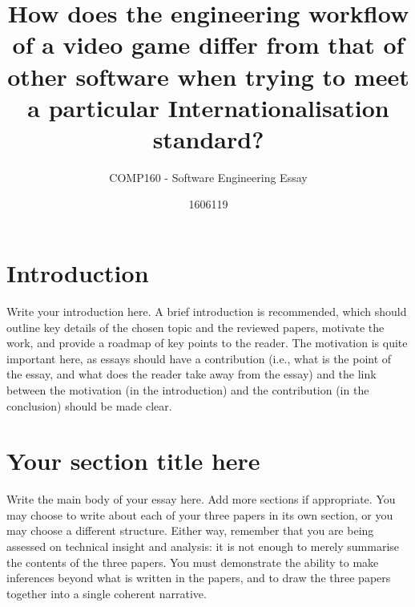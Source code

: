 \documentclass{scrartcl}
\title{How does the engineering workflow of a video game differ from that of other software when trying to meet a particular Internationalisation standard?}
\subtitle{COMP160 - Software Engineering Essay}
\author{1606119}
\begin{document}
\maketitle


\section{Introduction}

Write your introduction here. A brief introduction is recommended, which should outline key details of the chosen topic and the reviewed papers, motivate the work, and provide a roadmap of key points to the reader. The motivation is quite important here, as essays should have a contribution (i.e., what is the point of the essay, and what does the reader take away from the essay) and the link between the motivation (in the introduction) and the contribution (in the conclusion) should be made clear.

\section{Your section title here}

Write the main body of your essay here. Add more sections if appropriate. You may choose to write about each of your three papers in its own section, or you may choose a different structure. Either way, remember that you are being assessed on technical insight and analysis: it is not enough to merely summarise the contents of the three papers. You must demonstrate the ability to make inferences beyond what is written in the papers, and to draw the three papers together into a single coherent narrative.
\end{document}
